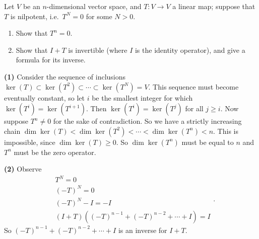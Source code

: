 \begin{problem}
Let $V$ be an $n$-dimensional vector space, and $T : V \to V$ a linear map; suppose that $T$ is nilpotent, i.e.\ $T^N = 0$ for some $N > 0$.
\begin{enumerate}
  \item Show that $T^n = 0$.
  \item Show that $I+T$ is invertible (where $I$ is the identity operator), and give a formula for its inverse.
\end{enumerate}
\end{problem}

\textbf{(1)} Consider the sequence of inclusions $\ker(T)\subset \ker(T^2)\subset \cdots \subset \ker(T^N) = V$. This sequence must become eventually constant, so let $i$ be the smallest integer for which $\ker(T^i)=\ker(T^{i+1})$. Then $\ker(T^i)=\ker(T^j)$ for all $j\geq i$. Now suppose $T^n\neq 0$ for the sake of contradiction. So we have a strictly increasing chain $\dim \ker(T) < \dim \ker(T^2) < \cdots < \dim \ker(T^n) < n$. This is impossible, since $\dim \ker(T) \geq 0$. So $\dim \ker(T^n)$ must be equal to $n$ and $T^n$ must be the zero operator.  

\textbf{(2)} Observe
\[
  \begin{aligned}
    &T^N=0\\
    &(-T)^N=0\\
    &(-T)^N-I=-I\\
    &(I+T)((-T)^{n-1}+(-T)^{n-2}+\cdots+I)=I
  \end{aligned}
.\] 
So $(-T)^{n-1}+(-T)^{n-2}+\cdots+I$ is an inverse for $I+T$. 